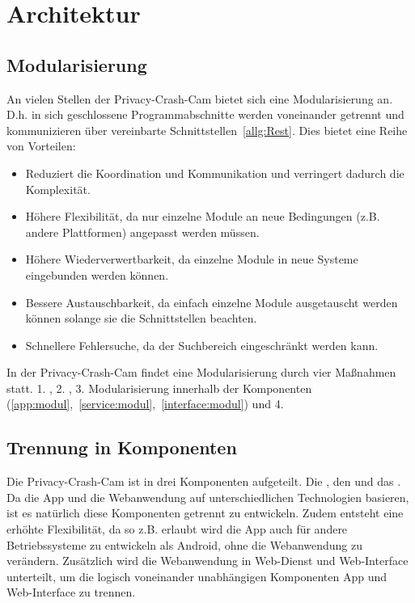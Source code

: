 \chapter{Architektur}
\section{Modularisierung}
An vielen Stellen der Privacy-Crash-Cam bietet sich eine Modularisierung an. D.h. in sich geschlossene Programmabschnitte werden voneinander getrennt und kommunizieren über vereinbarte Schnittstellen~\eqref{allg:Rest}. Dies bietet eine Reihe von Vorteilen:
\begin{itemize}
\itemsep0pt
\item Reduziert die Koordination und Kommunikation und verringert dadurch die Komplexität.
\item Höhere Flexibilität, da nur einzelne Module an neue Bedingungen (z.B. andere Plattformen) angepasst werden müssen.
\item Höhere Wiederverwertbarkeit, da einzelne Module in neue Systeme eingebunden werden können.
\item Bessere Austauschbarkeit, da einfach einzelne Module ausgetauscht werden können solange sie die Schnittstellen beachten.
\item Schnellere Fehlersuche, da der Suchbereich eingeschränkt werden kann.
\end{itemize}

In der Privacy-Crash-Cam findet eine Modularisierung durch vier Maßnahmen statt. 1. , 2. , 3. Modularisierung innerhalb der Komponenten (\eqref{app:modul},~\eqref{service:modul},~\eqref{interface:modul}) und 4. 

\section{Trennung in Komponenten} \label{allg:Komponenten}

Die Privacy-Crash-Cam ist in drei Komponenten aufgeteilt. Die , den  und das . \newline
Da die App und die Webanwendung auf unterschiedlichen Technologien basieren, ist es natürlich diese Komponenten getrennt zu entwickeln. Zudem entsteht eine erhöhte Flexibilität, da so z.B. erlaubt wird die App auch für andere Betriebssysteme zu entwickeln als Android, ohne die Webanwendung zu verändern. \newline
Zusätzlich wird die Webanwendung in Web-Dienst und Web-Interface unterteilt, um die logisch voneinander unabhängigen Komponenten App und Web-Interface zu trennen.

